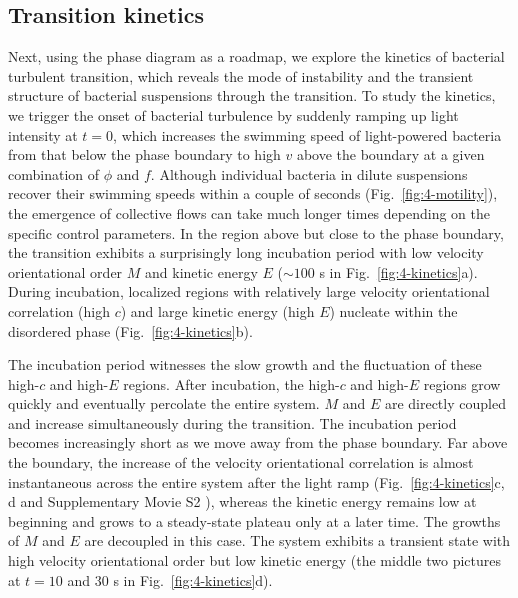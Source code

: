 \subsection{Transition kinetics}
Next, using the phase diagram as a roadmap, we explore the kinetics of bacterial turbulent transition, which reveals the mode of instability and the transient structure of bacterial suspensions through the transition. To study the kinetics, we trigger the onset of bacterial turbulence by suddenly ramping up light intensity at $t = 0$, which increases the swimming speed of light-powered bacteria from that below the phase boundary to high $v$ above the boundary at a given combination of $\phi$ and $f$. Although individual bacteria in dilute suspensions recover their swimming speeds within a couple of seconds (Fig.~\ref{fig:4-motility}), the emergence of collective flows can take much longer times depending on the specific control parameters. In the region above but close to the phase boundary, the transition exhibits a surprisingly long incubation period with low velocity orientational order $M$ and kinetic energy $E$ ($\sim 100$ s in Fig.~\ref{fig:4-kinetics}a). During incubation, localized regions with relatively large velocity orientational correlation (high $c$) and large kinetic energy (high $E$) nucleate within the disordered phase (Fig.~\ref{fig:4-kinetics}b).

The incubation period witnesses the slow growth and the fluctuation of these high-$c$ and high-$E$ regions. After incubation, the high-$c$ and high-$E$ regions grow quickly and eventually percolate the entire system.
$M$ and $E$ are directly coupled and increase simultaneously during the transition. The incubation period becomes increasingly short as we move away from the phase boundary.
Far above the boundary, the increase of the velocity orientational correlation is almost instantaneous across the entire system after the light ramp (Fig.~\ref{fig:4-kinetics}c, d and Supplementary Movie S2 \cite{suppMovies}), whereas the kinetic energy remains low at beginning and grows to a steady-state plateau only at a later time.
The growths of $M$ and $E$ are decoupled in this case.
The system exhibits a transient state with high velocity orientational order but low kinetic energy (the middle two pictures at $t = 10$ and $30$ s in Fig.~\ref{fig:4-kinetics}d).

